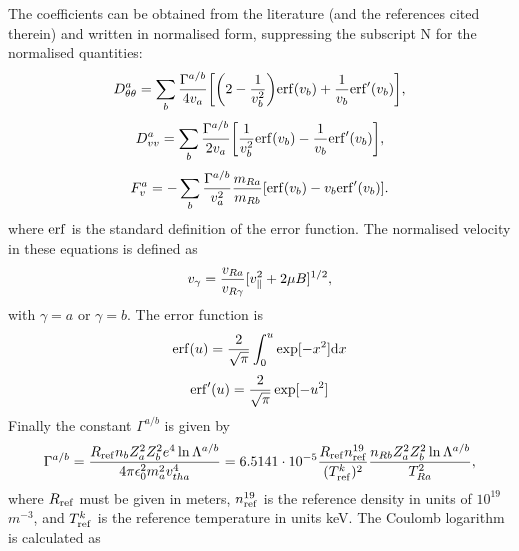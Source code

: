 The coefficients can be obtained from the literature \cite{KAR86} (and the references cited therein) and written in normalised form, suppressing the subscript N for the normalised quantities:	
\begin{equation} 
D_{\theta \theta}^{a} = \sum_b {\Gamma^{a/b} \over 4 v_{a}} \biggl [ \biggl ( 2 - {1\over v_{b}^2} \biggr ) 
{\rm erf}(v_{b}) + {1 \over v_{b}} {\rm erf}^\prime (v_{b}) \biggr ] ,
\end{equation}
\begin{equation} 
D_{vv}^{a} = \sum_b { \Gamma^{a/b}  \over 2 v_{a}} \biggl [ {1 \over v_{b}^2} {\rm erf}(v_{b}) - 
{1\over v_{b}}{\rm erf}^\prime (v_{b}) \biggr ] ,
\end{equation} 
\begin{equation} 
F_{v}^{a} = - \sum_b {\Gamma^{a/b} \over v_{a}^2} {m_{Ra} \over m_{Rb}} [ {\rm erf}(v_{b}) - v_{b} {\rm erf}^\prime (v_{b})  ]  .
\end{equation} 
where ${\rm erf}$ is the standard definition of the error function.  The normalised velocity in these equations is defined as 
\begin{equation}
v_{\gamma} =  {v_{Ra} \over v_{R\gamma}}[ v_{\parallel }^2 + 2 \mu B ]^{1/2} ,
\end{equation}
with $\gamma = a$ or $\gamma = b$.  The error function is  
\begin{equation} 
{\rm erf}(u) = {2 \over \sqrt{\pi}} \int_0^u \exp [ -x^2] {\rm d} x 
\end{equation} 
\begin{equation} 
{\rm erf}^\prime(u) = {2 \over \sqrt{\pi}} \exp [ -u^2] 
\end{equation}
Finally the constant $\Gamma^{a/b}$ is given by 
\begin{align} 
\Gamma^{a/b} = {R_{\rm ref} n_b Z_a^2 Z_b^2 e^4 \ln \Lambda^{a/b} \over 4 \pi \epsilon_0^2 m_a^2 v_{tha}^4} = 
6.5141\cdot 10^{-5} {R_{\rm ref} n_{\rm ref}^{19} \over (T_{\rm ref}^k)^2}  {n_{Rb} Z_a^2 Z_b^2 \ln \Lambda^{a/b} 
\over T_{Ra}^2} ,
\label{eq:refquantities-collisions-constraint}
\end{align}
where $R_{\rm ref}$ must be given in meters, $n_{\rm ref}^{19}$ is the reference density in units of $10^{19}$
$m^{-3}$, and $T_{\rm ref}^k$ is the reference temperature in units keV. The Coulomb logarithm is calculated as
